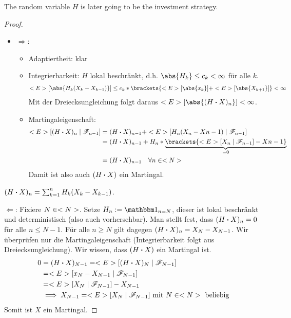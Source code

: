 \begin{*remark}
	The random variable $H$ is later going to be the investment strategy. 
\end{*remark}
\begin{proof}
	\begin{itemize}
		\item $\Rightarrow$:
		\begin{itemize}
			\item Adaptiertheit: klar
			\item Integrierbarkeit: $H$ lokal beschränkt, d.h. $\abs{H_k} \le c_k < \infty$ für alle $k$.
			\begin{align*}
			\E[\abs{H_k (X_k - X_{k-1})}] \le c_k * \brackets{\E[\abs{x_k}] + \E[\abs{X_{k+1}}]} < \infty
			\end{align*}
			Mit der Dreiecksungleichung folgt daraus $\E[\abs{(H \bigcdot X)_n}] < \infty$.
			\item Martingaleigenschaft: 
			\begin{align*}
			\E[(H \bigcdot X)_n \mid \F_{n-1}] &= (H \bigcdot X)_{n-1} + \E[H_n (X_n - X{n-1}) \mid \F_{n-1}]\\
			&=  (H \bigcdot X)_{n-1} + H_n * \underbrace{\brackets{\E[X_n \mid \F_{n-1}] - X{n-1}}}_{=0}\\ 
			&=(H \bigcdot X)_{n-1} \quad \forall n \in \N
			\end{align*}
			Damit ist also auch $(H \boldsymbol{\cdot} X)$ ein Martingal.		
		\end{itemize}
	\end{itemize} $(H \boldsymbol{\cdot} X)_n = \sum_{k=1}^n H_k (X_k - X_{k-1})$.
	\item $\Leftarrow$: Fixiere $N \in <N>$. Setze $H_n := \indi_{n = N}$, dieser ist lokal beschränkt und deterministisch (also auch vorhersehbar). Man stellt fest, dass $(H \boldsymbol{\cdot} X)_n = 0$ für alle $n \le N-1$. Für alle $n \ge N$ gilt dagegen $(H \boldsymbol{\cdot} X)_n = X_N - X_{N-1}$. Wir überprüfen nur die Martingaleigenschaft (Integrierbarkeit folgt aus Dreiecksungleichung). Wir wissen, dass $(H \boldsymbol{\cdot} X)$ ein Martingal ist. 
	\begin{align*}
	0 &= (H \boldsymbol{\cdot} X)_{N-1} = <E>[(H \boldsymbol{\cdot} X)_N \mid \mathscr F_{N-1}]\\
	 &= <E>[x_N - X_{N-1} \mid \mathscr F_{N-1}]\\ 
	 &= <E>[X_N \mid \mathscr F_{N-1}] - X_{N-1}\\
	&\implies X_{N-1} = <E>[X_N \mid \mathscr F_{N-1}] \text{ mit } N \in <N> \text{ beliebig}
	\end{align*}
	Somit ist $X$ ein Martingal.
\end{proof}
